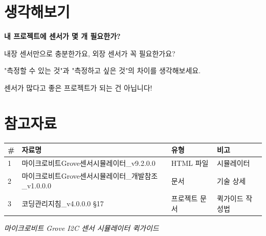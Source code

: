 \documentclass[11pt,a4paper]{article}
\begin{document}
\section*{ 생각해보기}

\begin{tcolorbox}[summarybox]
\textbf{내 프로젝트에 센서가 몇 개 필요한가?}

\vspace{0.3em}
내장 센서만으로 충분한가요, 외장 센서가 꼭 필요한가요?

"측정할 수 있는 것"과 "측정하고 싶은 것"의 차이를 생각해보세요.

센서가 많다고 좋은 프로젝트가 되는 건 아닙니다!

\end{tcolorbox}


\section*{참고자료}

\begin{center}
\renewcommand{\arraystretch}{1.4}
\begin{tabular}{|p{1.5cm}|p{8.3cm}|p{2.4cm}|p{2.8cm}|}
\hline
\rowcolor{tableheader}
\textbf{\#} & \textbf{자료명} & \textbf{유형} & \textbf{비고} \\
\hline
1 & 마이크로비트Grove센서시뮬레이터\_v9.2.0.0 & HTML 파일 & 시뮬레이터 \\
\hline
2 & 마이크로비트Grove센서시뮬레이터\_개발참조\_v1.0.0.0 & 문서 & 기술 상세 \\
\hline
3 & 코딩관리지침\_v4.0.0.0 \S{}17 & 프로젝트 문서 & 퀵가이드 작성법 \\
\hline
\end{tabular}
\end{center}


\vfill
\begin{center}
\small\color{lightbrown}
\textit{마이크로비트 Grove I2C 센서 시뮬레이터 퀵가이드}
\end{center}
\end{document}
